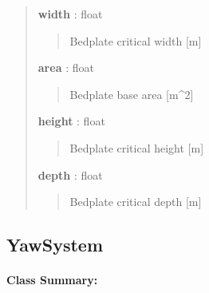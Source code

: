 \documentclass[letterpaper,10pt,openany,oneside]{sphinxmanual}
\begin{document}
\begin{fulllineitems}
\begin{quote}
\begin{description}
\textbf{width} : float
\begin{quote}

Bedplate critical width {[}m{]}
\end{quote}

\textbf{area} : float
\begin{quote}

Bedplate base area {[}m\textasciicircum{}2{]}
\end{quote}

\textbf{height} : float
\begin{quote}

Bedplate critical height {[}m{]}
\end{quote}

\textbf{depth} : float
\begin{quote}

Bedplate critical depth {[}m{]}
\end{quote}

\end{description}\end{quote}

\end{fulllineitems}



\subsection{YawSystem}
\label{documentation:yawsystem-class-label}\label{documentation:yawsystem}\paragraph{Class Summary:}
\end{document}
